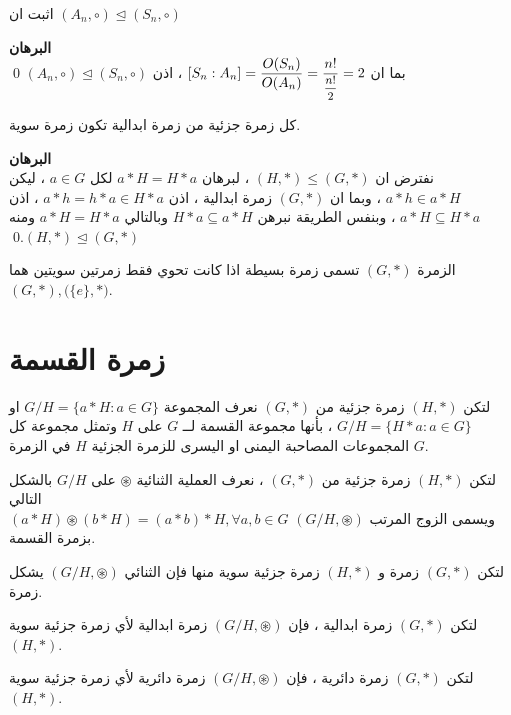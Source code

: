  \begin{example}
 	اثبت ان 
 	$(A_n, \circ) \trianglelefteq (S_n, \circ)$ 
 \end{example}
 \noindent
 \textbf{البرهان}\\
 \noindent
 بما ان 
 $[S_n : A_n] = \dfrac{O(S_n)}{O(A_n) } = \dfrac{n!}{\mfrac{n!}{2}} = 2$ ، 
 اذن  	$(A_n, \circ) \trianglelefteq (S_n, \circ)$ \qed
 
 \begin{theorem}
 	كل زمرة جزئية من زمرة ابدالية تكون زمرة سوية.
 \end{theorem}
 \noindent
 \textbf{البرهان}\\
 \noindent
 نفترض ان $(H, *)\leq (G, *)$ ،
 لبرهان $a*H = H*a$ لكل $a\in G$ ،
 ليكن $a*h \in a*H$ ، وبما ان $(G, *)$ زمرة ابدالية ، اذن $a*h = h*a \in H*a$ ،
  اذن $a*H\subseteq H*a$ ، وبنفس الطريقة نبرهن $H*a\subseteq a*H$ وبالتالي $a*H=H*a$ ومنه 
  $(H, *) \trianglelefteq (G, *)$.\qed
  
  \begin{definition}
  	الزمرة $(G, *)$ تسمى زمرة بسيطة اذا كانت تحوي فقط زمرتين سويتين هما 
  	$(G, *) , \big(\{e\}, *\big)$.
  \end{definition}
  
  \newpage
  
  \section{زمرة القسمة}
  \begin{definition}
  	لتكن $(H, *)$ زمرة جزئية من $(G, *)$ نعرف المجموعة
  $G/H = \{a*H : a\in G\}$  او $ G/H = \{H*a : a\in G\}$ ، بأنها مجموعة القسمة لــ $G$ على $H$ وتمثل مجموعة كل المجموعات المصاحبة اليمنى او اليسرى للزمرة الجزئية $H$ في الزمرة $G$.
  \end{definition}
  
  \begin{definition}
  	لتكن $(H, *)$ زمرة جزئية من $(G , *)$ ، نعرف العملية الثنائية $\circledast$ على $G/H$ بالشكل التالي\\
  	$
  	(a*H)\circledast (b*H) = (a*b) *H, \forall a, b\in G
  	$
  	ويسمى الزوج المرتب $(G/H, \circledast)$ بزمرة القسمة.
  \end{definition}
  
  \begin{theorem}
  	لتكن $(G, *)$ زمرة و $(H, *)$ زمرة جزئية سوية منها فإن الثنائي $(G/H, \circledast)$ يشكل زمرة.
  \end{theorem}
  
  \begin{theorem}
  	لتكن $(G, *)$ زمرة ابدالية ، فإن $(G/H, \circledast)$ زمرة ابدالية لأي زمرة جزئية سوية $(H, *)$.
  \end{theorem}
  
  \begin{theorem}
  	لتكن $(G, *)$ زمرة دائرية ، فإن $(G/H, \circledast)$ زمرة دائرية لأي زمرة جزئية سوية $(H, *)$.
  \end{theorem}
  
  
 
